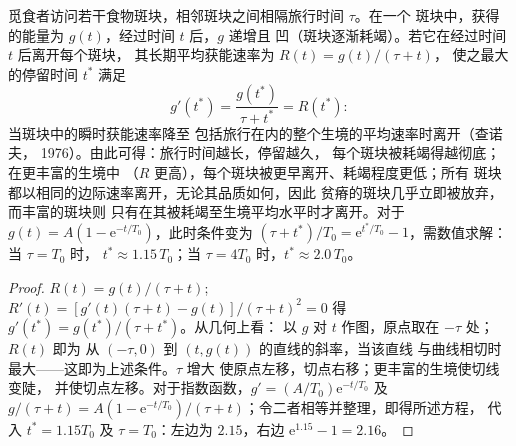 \begin{theorem}[边际值定理]\label{thm:b3:behavioural-ecology:mvt}
觅食者访问若干食物斑块，相邻斑块之间相隔旅行时间 $\tau$。在一个
斑块中，获得的能量为 $g(t)$，经过时间 $t$ 后，$g$ 递增且
凹（斑块逐渐耗竭）。若它在经过时间 $t$ 后离开每个斑块，
其长期平均获能速率为 $R(t) = g(t)/(\tau + t)$，
使之最大的停留时间 $t^{*}$ 满足
\[
g'(t^{*}) = \frac{g(t^{*})}{\tau + t^{*}} = R(t^{*}) :
\]
当斑块中的瞬时获能速率降至
包括旅行在内的整个生境的平均速率时离开（查诺夫，
1976）。由此可得：旅行时间越长，停留越久，
每个斑块被耗竭得越彻底；在更丰富的生境中
（$R$ 更高），每个斑块被更早离开、耗竭程度更低；所有
斑块都以相同的边际速率离开，无论其品质如何，因此
贫瘠的斑块几乎立即被放弃，而丰富的斑块则
只有在其被耗竭至生境平均水平时才离开。对于 $g(t) = A(1 -
\mathrm{e}^{-t/T_{0}})$，此时条件变为 $(\tau + t^{*})/T_{0} =
\mathrm{e}^{t^{*}/T_{0}} - 1$，需数值求解：当 $\tau = T_{0}$ 时，
$t^{*} \approx 1.15\,T_{0}$；当 $\tau = 4T_{0}$ 时，$t^{*} \approx
2.0\,T_{0}$。
\end{theorem}
\begin{proof}
$R(t) = g(t)/(\tau + t)$; $R'(t) = [g'(t)(\tau + t) - g(t)]/(\tau +
t)^{2} = 0$ 得 $g'(t^{*}) = g(t^{*})/(\tau + t^{*})$。从几何上看：
以 $g$ 对 $t$ 作图，原点取在 $-\tau$ 处；$R(t)$ 即为
从 $(-\tau, 0)$ 到 $(t, g(t))$ 的直线的斜率，当该直线
与曲线相切时最大——这即为上述条件。$\tau$ 增大
使原点左移，切点右移；更丰富的生境使切线变陡，
并使切点左移。对于指数函数，$g' = (A/T_{0})
\mathrm{e}^{-t/T_{0}}$ 及 $g/(\tau + t) = A(1 - \mathrm{e}^{-t/T_{0}})/
(\tau + t)$；令二者相等并整理，即得所述方程，
代入 $t^{*} = 1.15T_{0}$ 及 $\tau = T_{0}$：左边为 $2.15$，右边
$\mathrm{e}^{1.15} - 1 = 2.16$。
\end{proof}

